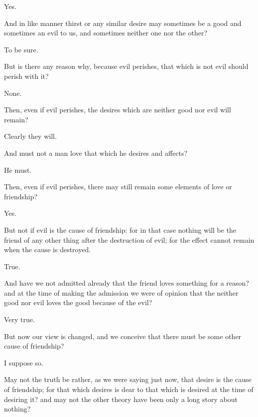 \documentclass[11pt,letter]{article}
\begin{document}
\par  Yes.

\par  And in like manner thirst or any similar desire may sometimes be a good and sometimes an evil to us, and sometimes neither one nor the other?

\par  To be sure.

\par  But is there any reason why, because evil perishes, that which is not evil should perish with it?

\par  None.

\par  Then, even if evil perishes, the desires which are neither good nor evil will remain?

\par  Clearly they will.

\par  And must not a man love that which he desires and affects?

\par  He must.

\par  Then, even if evil perishes, there may still remain some elements of love or friendship?

\par  Yes.

\par  But not if evil is the cause of friendship: for in that case nothing will be the friend of any other thing after the destruction of evil; for the effect cannot remain when the cause is destroyed.

\par  True.

\par  And have we not admitted already that the friend loves something for a reason? and at the time of making the admission we were of opinion that the neither good nor evil loves the good because of the evil?

\par  Very true.

\par  But now our view is changed, and we conceive that there must be some other cause of friendship?

\par  I suppose so.

\par  May not the truth be rather, as we were saying just now, that desire is the cause of friendship; for that which desires is dear to that which is desired at the time of desiring it? and may not the other theory have been only a long story about nothing?
\end{document}
